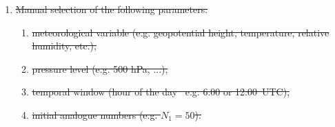 \documentclass[hess, manuscript]{copernicus}
\providecommand{\DIFdel}[1]{{\protect\color{red}\sout{#1}}}                      %
\providecommand{\DIFdelbegin}{} %
\begin{document}
	\begin{enumerate}
		\item \DIFdelbegin \DIFdel{Manual selection of the following parameters:
		}%
\begin{enumerate}%
\item%
\DIFdel{meteorological variable (e.g. geopotential height, temperature, relative humidity, etc.),
			}%
\item%
\DIFdel{pressure level (e.g. 500 hPa, ...),
			}%
\item%
\DIFdel{temporal window (hour of the day \textendash\ e.g. 6:00 or 12:00~UTC),
			}%
\item%
\DIFdel{initial analogue numbers (e.g. $N_{1}=50$).
		}
\end{enumerate}%


\end{enumerate}
\end{document}
